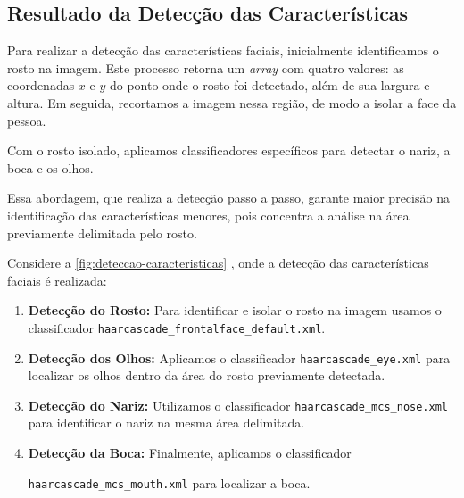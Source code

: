 \subsection{Resultado da Detecção das Características}

Para realizar a detecção das características faciais, inicialmente identificamos o rosto na imagem. Este processo retorna um \textit{array} com quatro valores: as coordenadas $x$ e $y$ do ponto onde o rosto foi detectado, além de sua largura e altura. Em seguida, recortamos a imagem nessa região, de modo a isolar a face da pessoa.

Com o rosto isolado, aplicamos classificadores específicos para detectar o nariz, a boca e os olhos.

Essa abordagem, que realiza a detecção passo a passo, garante maior precisão na identificação das características menores, pois concentra a análise na área previamente delimitada pelo rosto.

Considere a  \autoref{fig:deteccao-caracteristicas} , onde a detecção das características faciais é realizada:

\begin{enumerate}
\item \textbf{Detecção do Rosto:} Para identificar e isolar o rosto na imagem usamos o classificador \texttt{haarcascade\_frontalface\_default.xml}.
\item \textbf{Detecção dos Olhos:} Aplicamos o classificador \texttt{haarcascade\_eye.xml} para localizar os olhos dentro da área do rosto previamente detectada.
\item \textbf{Detecção do Nariz:} Utilizamos o classificador \texttt{haarcascade\_mcs\_nose.xml} para identificar o nariz na mesma área delimitada.
\item \textbf{Detecção da Boca:} Finalmente, aplicamos o classificador 

\texttt{haarcascade\_mcs\_mouth.xml} para localizar a boca.
\end{enumerate}

